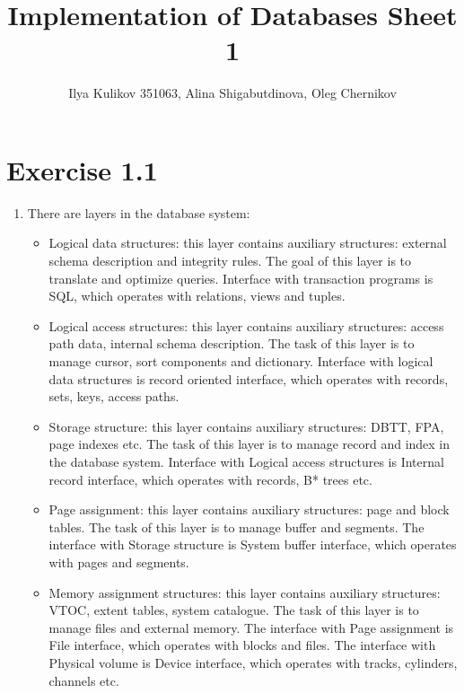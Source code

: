 \documentclass[10pt]{article}
\title{Implementation of Databases Sheet 1}
\author{Ilya Kulikov 351063, Alina Shigabutdinova, Oleg Chernikov}
\begin{document}
  \maketitle
  \section*{Exercise 1.1}
  \begin{enumerate}[label=\arabic*.] 
      \item
        There are layers in the database system:
        \begin{itemize}
          \item Logical data structures: this layer contains auxiliary structures:
          external schema description and integrity rules. The goal of this layer is
          to translate and optimize queries. Interface with transaction programs is
          SQL, which operates with relations, views and tuples.
          \item Logical access structures: this layer contains auxiliary structures:
          access path data, internal schema description. The task of this layer is to
          manage cursor, sort components and dictionary. Interface with logical data
          structures is record oriented interface, which operates with records, sets,
          keys, access paths.
          \item Storage structure: this layer contains auxiliary structures: DBTT, FPA,
          page indexes etc. The task of this layer is to manage record and index in the
          database system. Interface with Logical access structures is Internal record
          interface, which operates with records, B* trees etc.
          \item Page assignment: this layer contains auxiliary structures: page and
          block tables. The task of this layer is to manage buffer and segments. The
          interface with Storage structure is System buffer interface, which operates
          with pages and segments.
          \item Memory assignment structures: this layer contains auxiliary structures:
          VTOC, extent tables, system catalogue. The task of this layer is to manage files
          and external memory. The interface with Page assignment is File interface,
          which operates with blocks and files. The interface with Physical volume is
          Device interface, which operates with tracks, cylinders, channels etc.
        \end{itemize}

\end{enumerate}
\end{document}
